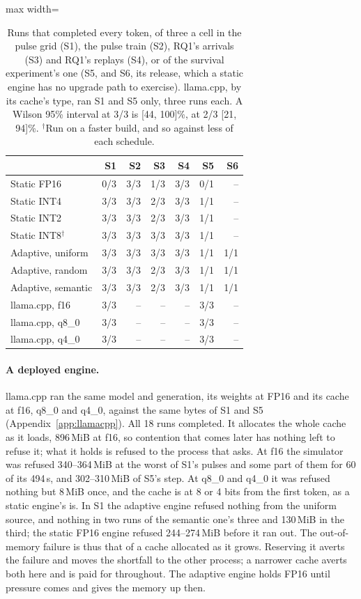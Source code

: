 \documentclass{article}
\begin{document}
\begin{table}[t]
\caption{Runs that completed every token, of three a cell in the pulse grid
(S1), the pulse train (S2), RQ1's arrivals (S3) and RQ1's replays (S4), or of
the survival experiment's one (S5, and S6, its release, which a static engine
has no upgrade path to exercise). llama.cpp, by its cache's type, ran S1 and S5
only, three runs each. A Wilson 95\% interval at 3/3 is
[44, 100]\%, at 2/3 [21, 94]\%. $^\dagger$Run on a faster build, and so
against less of each schedule.}
\label{tab:matrix}
\centering
\small
\begin{adjustbox}{max width=\columnwidth}
\begin{tabular}{lrrrrrr}
\toprule
& S1 & S2 & S3 & S4 & S5 & S6 \\
\midrule
Static FP16 & 0/3 & 3/3 & 1/3 & 3/3 & 0/1 & -- \\
Static INT4 & 3/3 & 3/3 & 2/3 & 3/3 & 1/1 & -- \\
Static INT2 & 3/3 & 3/3 & 2/3 & 3/3 & 1/1 & -- \\
Static INT8$^\dagger$ & 3/3 & 3/3 & 3/3 & 3/3 & 1/1 & -- \\
Adaptive, uniform & 3/3 & 3/3 & 3/3 & 3/3 & 1/1 & 1/1 \\
Adaptive, random & 3/3 & 3/3 & 2/3 & 3/3 & 1/1 & 1/1 \\
Adaptive, semantic & 3/3 & 3/3 & 2/3 & 3/3 & 1/1 & 1/1 \\
\midrule
llama.cpp, f16 & 3/3 & -- & -- & -- & 3/3 & -- \\
llama.cpp, q8\_0 & 3/3 & -- & -- & -- & 3/3 & -- \\
llama.cpp, q4\_0 & 3/3 & -- & -- & -- & 3/3 & -- \\
\bottomrule
\end{tabular}
\end{adjustbox}
\end{table}

\paragraph{A deployed engine.} llama.cpp ran the same model and generation, its
weights at FP16 and its cache at f16, q8\_0 and q4\_0, against the same bytes of
S1 and S5 (Appendix~\ref{app:llamacpp}). All 18 runs completed. It allocates the
whole cache as it loads, 896\,MiB at f16, so contention that comes later has
nothing left to refuse it; what it holds is refused to the process that asks. At
f16 the simulator was refused 340--364\,MiB at the worst of S1's pulses and some
part of them for 60 of its 494\,s, and 302--310\,MiB of S5's step. At q8\_0 and
q4\_0 it was refused nothing but 8\,MiB once, and the cache is at 8 or 4 bits
from the first token, as a static engine's is. In S1 the adaptive engine refused
nothing from the uniform source, and nothing in two runs of the semantic one's
three and 130\,MiB in the third; the static FP16 engine refused 244--274\,MiB
before it ran out. The out-of-memory failure is thus that of a cache
allocated as it grows. Reserving it averts the failure and moves the shortfall
to the other process; a narrower cache averts both here and is paid for throughout.
The adaptive engine holds FP16 until pressure comes and gives the memory up
then.
\end{document}
